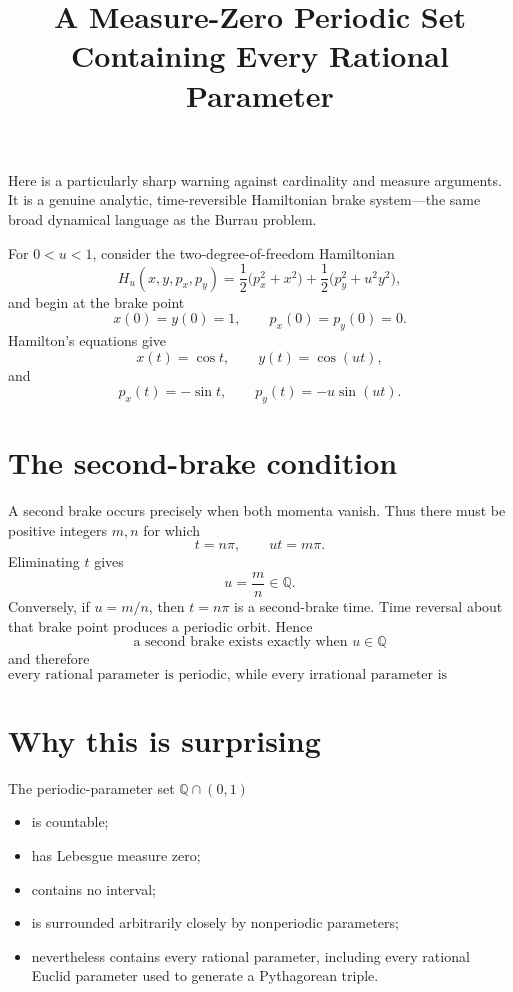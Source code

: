\documentclass[11pt]{article}
\title{A Measure-Zero Periodic Set Containing Every Rational Parameter}
\author{}
\date{}
\begin{document}
\maketitle

Here is a particularly sharp warning against cardinality and measure arguments.
It is a genuine analytic, time-reversible Hamiltonian brake system---the same
broad dynamical language as the Burrau problem.

For \(0<u<1\), consider the two-degree-of-freedom Hamiltonian
\[
  H_u(x,y,p_x,p_y)
  =\frac12\bigl(p_x^2+x^2\bigr)
   +\frac12\bigl(p_y^2+u^2y^2\bigr),
\]
and begin at the brake point
\[
  x(0)=y(0)=1,
  \qquad
  p_x(0)=p_y(0)=0.
\]
Hamilton's equations give
\[
  x(t)=\cos t,
  \qquad
  y(t)=\cos(ut),
\]
and
\[
  p_x(t)=-\sin t,
  \qquad
  p_y(t)=-u\sin(ut).
\]

\section*{The second-brake condition}

A second brake occurs precisely when both momenta vanish.  Thus there must be
positive integers \(m,n\) for which
\[
  t=n\pi,
  \qquad
  ut=m\pi.
\]
Eliminating \(t\) gives
\[
  u=\frac{m}{n}\in\mathbb{Q}.
\]
Conversely, if \(u=m/n\), then \(t=n\pi\) is a second-brake time.  Time
reversal about that brake point produces a periodic orbit.  Hence
\[
  \boxed{
    \text{a second brake exists exactly when }u\in\mathbb{Q}
  }
\]
and therefore
\[
  \boxed{
    \text{every rational parameter is periodic, while every irrational
    parameter is nonperiodic.}
  }
\]

\section*{Why this is surprising}

The periodic-parameter set \(\mathbb{Q}\cap(0,1)\)
\begin{itemize}
  \item is countable;
  \item has Lebesgue measure zero;
  \item contains no interval;
  \item is surrounded arbitrarily closely by nonperiodic parameters;
  \item nevertheless contains every rational parameter, including every
        rational Euclid parameter used to generate a Pythagorean triple.
\end{itemize}
\end{document}
